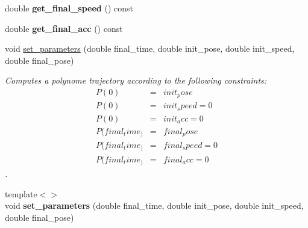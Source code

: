 \begin{DoxyCompactItemize}
\item 
double {\bfseries get\+\_\+final\+\_\+speed} () const \hypertarget{classblmc__robots_1_1TimePolynome_ac38918a18c0ef5907cce2aa851178299}{}\label{classblmc__robots_1_1TimePolynome_ac38918a18c0ef5907cce2aa851178299}

\item 
double {\bfseries get\+\_\+final\+\_\+acc} () const \hypertarget{classblmc__robots_1_1TimePolynome_a0cec8beb341d6893caf7dba8fac8f0ca}{}\label{classblmc__robots_1_1TimePolynome_a0cec8beb341d6893caf7dba8fac8f0ca}

\item 
void \hyperlink{classblmc__robots_1_1TimePolynome_ac7576e3ab26e11a183268dcc4721e6e5}{set\+\_\+parameters} (double final\+\_\+time, double init\+\_\+pose, double init\+\_\+speed, double final\+\_\+pose)
\begin{DoxyCompactList}\small\item\em Computes a polynome trajectory according to the following constraints\+: \begin{eqnarray*} P(0) &=& init_pose \\ P(0) &=& init_speed = 0 \\ P(0) &=& init_acc = 0 \\ P(final_time_) &=& final_pose \\ P(final_time_) &=& final_speed = 0 \\ P(final_time_) &=& final_acc = 0 \end{eqnarray*}. \end{DoxyCompactList}\item 
{\footnotesize template$<$$>$ }\\void {\bfseries set\+\_\+parameters} (double final\+\_\+time, double init\+\_\+pose, double init\+\_\+speed, double final\+\_\+pose)\hypertarget{classblmc__robots_1_1TimePolynome_a46a01352c9e81a8135530facbf7cbcc6}{}\label{classblmc__robots_1_1TimePolynome_a46a01352c9e81a8135530facbf7cbcc6}

\end{DoxyCompactItemize}
